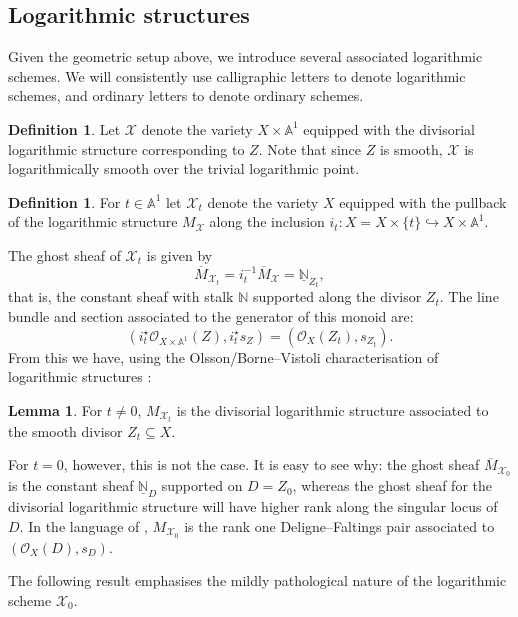 \documentclass[11pt]{amsart}
\theoremstyle{definition}
\theoremstyle{definition}
\newtheorem{lemma}[theorem]{Lemma}
\newtheorem{definition}[theorem]{Definition}
\newcommand{\st}{\star}
\newcommand{\ol}[1]{\overline{#1}}
\newcommand{\ul}[1]{\underline{#1}}
\newcommand{\Aaff}{\mathbb{A}}
\newcommand{\OO}{\mathcal{O}}
\newcommand{\N}{\mathbb{N}}
\newcommand{\Xcal}{\mathcal{X}}
\begin{document}
\subsection{Logarithmic structures}\label{sec: logarithmic structures} Given the geometric setup above, we introduce several associated logarithmic schemes. We will consistently use calligraphic letters to denote logarithmic schemes, and ordinary letters to denote ordinary schemes.

\begin{definition} Let $\Xcal$ denote the variety $X \times \Aaff^{\! 1}$ equipped with the divisorial logarithmic structure corresponding to $Z$. Note that since $Z$ is smooth, $\Xcal$ is logarithmically smooth over the trivial logarithmic point. \end{definition}

\begin{definition} For $t \in \Aaff^{\! 1}$ let $\Xcal_t$ denote the variety $X$ equipped with the pullback of the logarithmic structure $M_{\Xcal}$ along the inclusion $i_t \colon X = X \times \{ t \} \hookrightarrow X \times \Aaff^{\! 1}$.\end{definition}
 The ghost sheaf of $\Xcal_t$ is given by
\begin{equation*}\ol{M}_{\Xcal_t} = i_t^{-1} \ol{M}_{\Xcal} = \ul{\N}_{Z_t},\end{equation*}
that is, the constant sheaf with stalk $\N$ supported along the divisor $Z_t$. The line bundle and section associated to the generator of this monoid are:
\begin{equation*} (i_t^\st \OO_{X \times \Aaff^{\! 1}}(Z), i_t^\st s_{Z}) = (\OO_{X}(Z_t),s_{Z_t}).\end{equation*}
From this we have, using the Olsson/Borne--Vistoli characterisation of logarithmic structures \cite{OlssonLogStacks,BorneVistoli}:
\begin{lemma} For $t \neq 0$, $M_{\Xcal_t}$ is the divisorial logarithmic structure associated to the smooth divisor $Z_t \subseteq X$.\end{lemma}
 For $t=0$, however, this is not the case. It is easy to see why: the ghost sheaf $\ol{M}_{\Xcal_0}$ is the constant sheaf $\ul{\N}_D$ supported on $D=Z_0$, whereas the ghost sheaf for the divisorial logarithmic structure will have higher rank along the singular locus of $D$. In the language of \cite{ChenLog}, $M_{\Xcal_0}$ is the rank one Deligne--Faltings pair associated to $(\OO_{X}(D),s_{D})$. 

The following result emphasises the mildly pathological nature of the logarithmic scheme $\Xcal_0$.
\end{document}
